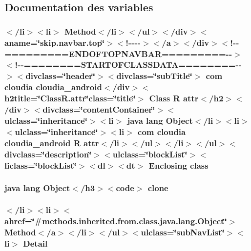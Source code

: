 \subsection{Documentation des variables}
\hypertarget{_r_8attr_8html_a446db8a04d987ce93ca7ef79ade5ee89}{
\subsubsection[{class}]{\setlength{\rightskip}{0pt plus 5cm}$<$/li$>$$<$li$>$ Method$<$/li$>$$<$/ul$>$$<$/div$>$$<$aname=\char`\"{}skip.\-navbar.\-top\char`\"{}$>$$<$!-\/-\/-\/-\/$>$$<$/a$>$$<$/div$>$$<$!-\/-\/=========E\-N\-D\-O\-F\-T\-O\-P\-N\-A\-V\-B\-A\-R=========-\/-\/$>$$<$!-\/-\/========S\-T\-A\-R\-T\-O\-F\-C\-L\-A\-S\-S\-D\-A\-T\-A========-\/-\/$>$$<$divclass=\char`\"{}header\char`\"{}$>$$<$divclass=\char`\"{}sub\-Title\char`\"{}$>$ com cloudia cloudia\-\_\-android$<$/div$>$$<$h2title=\char`\"{}Class\-R.\-attr\char`\"{}class=\char`\"{}title\char`\"{}$>$ Class {\bf R} attr$<$/h2$>$$<$/div$>$$<$divclass=\char`\"{}content\-Container\char`\"{}$>$$<$ulclass=\char`\"{}inheritance\char`\"{}$>$$<$li$>$ java lang Object$<$/li$>$$<$li$>$$<$ulclass=\char`\"{}inheritance\char`\"{}$>$$<$li$>$ com cloudia cloudia\-\_\-android {\bf R} attr$<$/li$>$$<$/ul$>$$<$/li$>$$<$/ul$>$$<$divclass=\char`\"{}description\char`\"{}$>$$<$ulclass=\char`\"{}block\-List\char`\"{}$>$$<$liclass=\char`\"{}block\-List\char`\"{}$>$$<$dl$>$$<${\bf dt}$>$ Enclosing class}}\label{_r_8attr_8html_a446db8a04d987ce93ca7ef79ade5ee89}
\hypertarget{_r_8attr_8html_adc9607fcabf6f2d7f401ad52015ef6e0}{
\subsubsection[{clone}]{\setlength{\rightskip}{0pt plus 5cm}java lang Object$<$/h3$>$$<$code$>$ clone}}\label{_r_8attr_8html_adc9607fcabf6f2d7f401ad52015ef6e0}
\hypertarget{_r_8attr_8html_aed0df2ae11502bf9389ac3cf53b1c0f6}{
\subsubsection[{Detail}]{\setlength{\rightskip}{0pt plus 5cm}$<$/li$>$$<$li$>$$<$ahref=\char`\"{}\#methods.\-inherited.\-from.\-class.\-java.\-lang.\-Object\char`\"{}$>$ Method$<$/{\bf a}$>$$<$/li$>$$<$/ul$>$$<$ulclass=\char`\"{}sub\-Nav\-List\char`\"{}$>$$<$li$>$ Detail}}\label{_r_8attr_8html_aed0df2ae11502bf9389ac3cf53b1c0f6}
